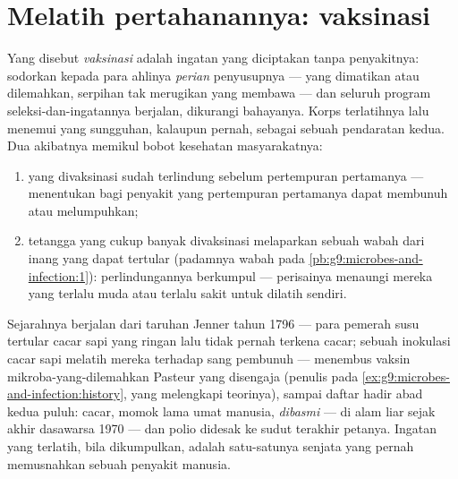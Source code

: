 \section{Melatih pertahanannya: vaksinasi}

\begin{proposition}[Vaksinasi]\label{prop:g9:immune-defenses:vaccination}
Yang disebut \emph{vaksinasi} adalah
ingatan  yang diciptakan tanpa penyakitnya:
sodorkan kepada para ahlinya \emph{perian} penyusupnya ---
 yang dimatikan atau dilemahkan, serpihan tak
merugikan yang membawa  --- dan seluruh program
seleksi-dan-ingatannya berjalan, dikurangi bahayanya. Korps
terlatihnya lalu menemui  yang sungguhan, kalaupun
pernah, sebagai sebuah pendaratan kedua. Dua akibatnya
memikul bobot kesehatan masyarakatnya:
\begin{enumerate}
  \item yang divaksinasi sudah terlindung sebelum
        pertempuran pertamanya --- menentukan bagi penyakit
        yang pertempuran pertamanya dapat membunuh atau
        melumpuhkan;
  \item tetangga yang cukup banyak divaksinasi melaparkan
        sebuah wabah dari inang yang dapat tertular
        (padamnya wabah pada
        \cref{pb:g9:microbes-and-infection:1}):
        perlindungannya berkumpul --- perisainya menaungi
        mereka yang terlalu muda atau terlalu sakit untuk
        dilatih sendiri.
\end{enumerate}
\end{proposition}
\admitted

\begin{example}\label{ex:g9:immune-defenses:history}
Sejarahnya berjalan dari taruhan Jenner tahun 1796 --- para
pemerah susu tertular cacar sapi yang ringan lalu tidak
pernah terkena cacar; sebuah inokulasi cacar sapi melatih
mereka terhadap sang pembunuh --- menembus vaksin
mikroba-yang-dilemahkan Pasteur yang disengaja (penulis pada
\cref{ex:g9:microbes-and-infection:history}, yang melengkapi
teorinya), sampai daftar hadir abad kedua puluh: cacar,
momok lama umat manusia, \emph{dibasmi} ---  
di alam liar sejak akhir dasawarsa 1970 --- dan polio
didesak ke sudut terakhir petanya. Ingatan yang terlatih,
bila dikumpulkan, adalah satu-satunya senjata yang pernah
memusnahkan sebuah penyakit manusia.
\end{example}

